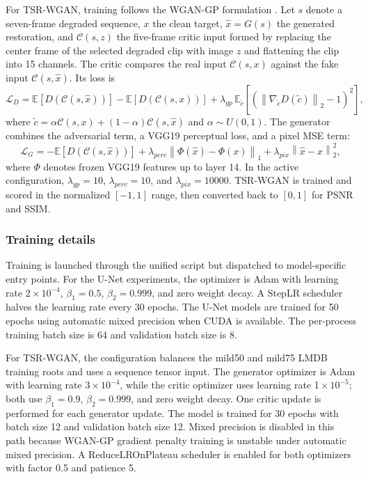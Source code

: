 \documentclass{article}
\begin{document}
For TSR-WGAN, training follows the WGAN-GP formulation \citep{arjovsky2017wgan,gulrajani2017wgangp}. Let $s$ denote a seven-frame degraded sequence, $x$ the clean target, $\hat{x}=G(s)$ the generated restoration, and $\mathcal{C}(s,z)$ the five-frame critic input formed by replacing the center frame of the selected degraded clip with image $z$ and flattening the clip into 15 channels. The critic compares the real input $\mathcal{C}(s,x)$ against the fake input $\mathcal{C}(s,\hat{x})$. Its loss is
\begin{equation}
\mathcal{L}_D
= \mathbb{E}\left[D(\mathcal{C}(s,\hat{x}))\right]
- \mathbb{E}\left[D(\mathcal{C}(s,x))\right]
+ \lambda_{gp}\,\mathbb{E}_{\tilde{c}}
\left[\left(\left\|\nabla_{\tilde{c}}D(\tilde{c})\right\|_2 - 1\right)^2\right],
\end{equation}
where $\tilde{c}=\alpha\mathcal{C}(s,x)+(1-\alpha)\mathcal{C}(s,\hat{x})$ and $\alpha\sim U(0,1)$. The generator combines the adversarial term, a VGG19 perceptual loss, and a pixel MSE term:
\begin{equation}
\mathcal{L}_G
= -\mathbb{E}\left[D(\mathcal{C}(s,\hat{x}))\right]
+ \lambda_{perc}\left\|\Phi(\hat{x})-\Phi(x)\right\|_1
+ \lambda_{pix}\left\|\hat{x}-x\right\|_2^2,
\end{equation}
where $\Phi$ denotes frozen VGG19 features up to layer 14. In the active configuration, $\lambda_{gp}=10$, $\lambda_{perc}=10$, and $\lambda_{pix}=10000$. TSR-WGAN is trained and scored in the normalized $[-1,1]$ range, then converted back to $[0,1]$ for PSNR and SSIM.

\subsubsection{Training details}
Training is launched through the unified script but dispatched to model-specific entry points. For the U-Net experiments, the optimizer is Adam with learning rate 2\,$\times$\,$10^{-4}$, $\beta_1=0.5$, $\beta_2=0.999$, and zero weight decay. A StepLR scheduler halves the learning rate every 30 epochs. The U-Net models are trained for 50 epochs using automatic mixed precision when CUDA is available. The per-process training batch size is 64 and validation batch size is 8.

For TSR-WGAN, the configuration balances the mild50 and mild75 LMDB training roots and uses a sequence tensor input. The generator optimizer is Adam with learning rate 3\,$\times$\,$10^{-4}$, while the critic optimizer uses learning rate 1\,$\times$\,$10^{-5}$; both use $\beta_1=0.9$, $\beta_2=0.999$, and zero weight decay. One critic update is performed for each generator update. The model is trained for 30 epochs with batch size 12 and validation batch size 12. Mixed precision is disabled in this path because WGAN-GP gradient penalty training is unstable under automatic mixed precision. A ReduceLROnPlateau scheduler is enabled for both optimizers with factor 0.5 and patience 5.
\end{document}
